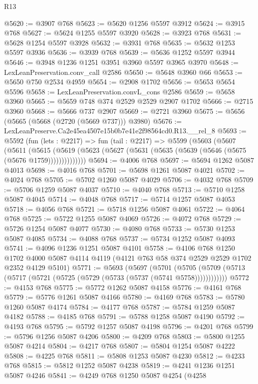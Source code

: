 \begin{lexlean}{R13}
\begin{coremodule}
@5620 := @3907 @768
@5623 := @5620 @1256 @5597 @3912
@5624 := @3915 @768
@5627 := @5624 @1255 @5597 @3920
@5628 := @3923 @768
@5631 := @5628 @1254 @5597 @3928
@5632 := @3931 @768
@5635 := @5632 @1253 @5597 @3936
@5636 := @3939 @768
@5639 := @5636 @1252 @5597 @3944
@5646 := @3948 @1236 @1251 @3951 @3960 @5597 @3965 @3970
@5648 := LexLeanPreservation.conv_call @2586
@5650 := @5648 @3960 @66
@5653 := @5650 @750 @2534 @4959
@5654 := @2908 @1702
@5656 := @5653 @5654 @5596
@5658 := LexLeanPreservation.convL_cons @2586
@5659 := @5658 @3960
@5665 := @5659 @748 @374 @2529 @2529 @2907 @1702
@5666 := @2715 @3960
@5668 := @5666 @737 @2907
@5669 := @2721 @3960
@5675 := @5656 (@5665 (@5668 (@2720 (@5669 @737))) @3980)
@5676 := LexLeanPreserve.Ca2e45ea4507e15b0b7e41e2f98564cd0.R13.__rel_8
@5693 := @5592
    (fun (lets : @2217) =>
    fun (tail : @2217) =>
    @5599
      (@5603
        (@5607
          (@5611
            (@5615
              (@5619 (@5623 (@5627 (@5631 (@5635 (@5639 (@5646 (@5675 (@5676 @1759))))))))))))))
@5694 := @4006 @768
@5697 := @5694 @1262 @5087 @4013
@5698 := @4016 @768
@5701 := @5698 @1261 @5087 @4021
@5702 := @4024 @768
@5705 := @5702 @1260 @5087 @4029
@5706 := @4032 @768
@5709 := @5706 @1259 @5087 @4037
@5710 := @4040 @768
@5713 := @5710 @1258 @5087 @4045
@5714 := @4048 @768
@5717 := @5714 @1257 @5087 @4053
@5718 := @4056 @768
@5721 := @5718 @1256 @5087 @4061
@5722 := @4064 @768
@5725 := @5722 @1255 @5087 @4069
@5726 := @4072 @768
@5729 := @5726 @1254 @5087 @4077
@5730 := @4080 @768
@5733 := @5730 @1253 @5087 @4085
@5734 := @4088 @768
@5737 := @5734 @1252 @5087 @4093
@5741 := @4096 @1236 @1251 @5087 @4101
@5758 := @4106
    @768
    @1250
    @1702
    @4000
    @5087
    @4114
    @4119
    (@4121 @763 @58 @374 @2529 @2529 @1702 @2352 @4129 @5101)
@5771 := @5693
    (@5697
      (@5701 (@5705 (@5709 (@5713 (@5717 (@5721 (@5725 (@5729 (@5733 (@5737 (@5741 @5758))))))))))))
@5772 := @4153 @768
@5775 := @5772 @1262 @5087 @4158
@5776 := @4161 @768
@5779 := @5776 @1261 @5087 @4166
@5780 := @4169 @768
@5783 := @5780 @1260 @5087 @4174
@5784 := @4177 @768
@5787 := @5784 @1259 @5087 @4182
@5788 := @4185 @768
@5791 := @5788 @1258 @5087 @4190
@5792 := @4193 @768
@5795 := @5792 @1257 @5087 @4198
@5796 := @4201 @768
@5799 := @5796 @1256 @5087 @4206
@5800 := @4209 @768
@5803 := @5800 @1255 @5087 @4214
@5804 := @4217 @768
@5807 := @5804 @1254 @5087 @4222
@5808 := @4225 @768
@5811 := @5808 @1253 @5087 @4230
@5812 := @4233 @768
@5815 := @5812 @1252 @5087 @4238
@5819 := @4241 @1236 @1251 @5087 @4246
@5841 := @4249
    @768
    @1250
    @5087
    @4254
    (@4258

\end{coremodule}
\end{lexlean}
